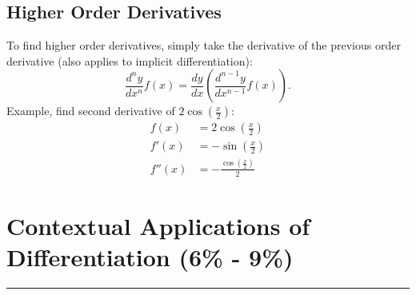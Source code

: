 \documentclass[12pt]{article}
\begin{document}
        \subsection{Higher Order Derivatives}
            To find higher order derivatives, simply take the derivative of the previous order derivative (also applies to implicit differentiation):
            \[ \frac{d^n y}{dx^n} f(x) = \frac{dy}{dx} \left( \frac{d^{n-1}y}{dx^{n-1}} f(x) \right). \]
            \newline
            Example, find second derivative of $2\cos \left( \frac{x}{2} \right)$:
            \begin{align*}
                f(x) &= 2\cos \left( \frac{x}{2} \right) \\[6pt]
                f'(x) &= -\sin \left( \frac{x}{2} \right) \\[6pt]
                f''(x) &= -\frac{\cos \left( \frac{x}{2} \right)}{2}
            \end{align*}

    \section{Contextual Applications of Differentiation (6\% - 9\%)}
    \par\noindent\rule{\textwidth}{0.1pt}
\end{document}

